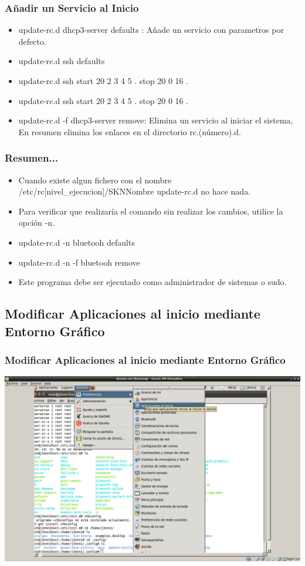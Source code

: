 \documentclass{beamer}
\begin{document}
\begin{frame}
\frametitle{A\~nadir un Servicio al Inicio}
\begin{itemize}
	\item \alert{update-rc.d dhcp3-server defaults} : A\~nade un servicio con parametros por defecto.
	\item update-rc.d ssh defaults
	\item update-rc.d ssh start 20 2 3 4 5 . stop 20 0 16 .
	\item update-rc.d ssh start 20 2 3 4 5 . stop 20 0 16 .
	\item \alert{update-rc.d -f dhcp3-server remove}: Elimina un servicio al iniciar el sistema, En resumen elimina los enlaces en el directorio rc.(n\'umero).d.
\end{itemize}
\end{frame}

\begin{frame}
\frametitle{Resumen...}
\begin{itemize}
 \item Cuando existe algun fichero con el nombre /etc/rc[nivel\_ejecucion]/SKNNombre update-rc.d no hace nada.
\item Para verificar que realizar\'ia el comando sin realizar los cambios, utilice la opci\'on -n. 
\item update-rc.d -n bluetooh defaults
\item update-rc.d -n -f bluetooh remove
\item Este programa debe ser ejecutado como administrador de sistemas o sudo.
\end{itemize}
\end{frame}

\subsection{Modificar Aplicaciones al inicio mediante Entorno Gr\'afico}
\begin{frame}
\frametitle{Modificar Aplicaciones al inicio mediante Entorno Gr\'afico}
	\includegraphics[height=0.5\textheight]{./imgs/inicio2.png} \hspace*{5.0cm}
\end{frame}
\end{document}
